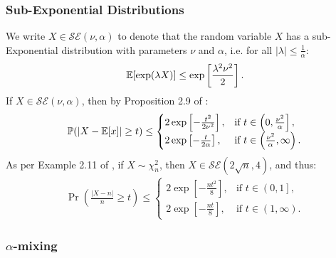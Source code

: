 \subsubsection{Sub-Exponential Distributions}

We write $X\in\mathcal{SE}(\nu, \alpha)$ to denote that the random variable $X$ has a sub-Exponential distribution with parameters $\nu$ and $\alpha$, i.e. for all $|\lambda| \leq \frac{1}{\alpha}$: 
\begin{align*}
    \mathbb{E}[\exp(\lambda X)] \leq \exp\left[\frac{\lambda^2\nu^2}{2}\right].
\end{align*}
If $X\in\mathcal{SE}(\nu, \alpha)$, then by Proposition 2.9 of \cite{Wainwright19}:
\begin{align}\label{eq:wainwright_prop_2.9}
    \mathbb{P}(|X - \mathbb{E}[x]| \geq t) \leq 
    \begin{cases}
        2 \exp\left[-\frac{t^2}{2\nu^2}\right], & \text{if } t \in \left(0, \frac{\nu^2}{\alpha}\right], \\
        2 \exp\left[-\frac{t}{2\alpha}\right], & \text{if } t \in \left(\frac{\nu^2}{\alpha}, \infty\right).
    \end{cases}
\end{align}
As per Example 2.11 of \cite{Wainwright19}, if $X \sim \chi^2_n$, then $X\in\mathcal{SE}(2\sqrt{n}, 4)$, and thus: 
\begin{align} \label{eq:chi2-ineq}
    \Pr\left(\frac{|X - n|}{n} \geq t\right) \leq 
    \begin{cases}
        2 \exp\left[-\frac{n t^2}{8}\right], & \text{if } t \in \left(0, 1\right], \\
        2 \exp\left[-\frac{n t}{8}\right], & \text{if } t \in \left(1, \infty\right).
    \end{cases}
\end{align}

\subsubsection{$\alpha$-mixing}

